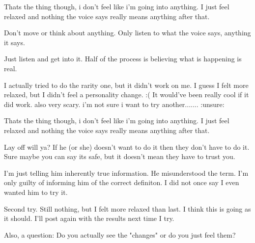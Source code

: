 \documentclass[ebook,12pt,oneside,openany]{memoir}
\begin{document}
\begin{tcolorbox}[title=Chigens and Kay,colback=olive!5!white,colframe=olive!75!black,coltitle=white]
\begin{tcolorbox}[title=Ponyworld Destroyer]
\par{Thats the thing though, i don't feel like i'm going into anything. I just feel relaxed and nothing the voice says really means anything after that.}
\end{tcolorbox}
\par{Don't move or think about anything. Only listen to what the voice says, anything it says.}
\newline{}
\par{Just listen and get into it. Half of the process is believing what is happening is real.}
\end{tcolorbox}
\begin{tcolorbox}[title=BeatrixBow]
\par{I actually tried to do the rarity one, but it didn't work on me. I guess I felt more relaxed, but I didn't feel a personality change. :( It would've been really cool if it did work. also very scary. i'm not sure i want to try another....... :unsure:}
\end{tcolorbox}
\begin{tcolorbox}[title=Harmonic Revelations,colback=brown!5!white,colframe=brown!75!black,coltitle=white]
\begin{tcolorbox}[title=Ponyworld Destroyer]
\par{Thats the thing though, i don't feel like i'm going into anything. I just feel relaxed and nothing the voice says really means anything after that.}
\newline{}
\newline{}
\par{Lay off will ya? If he (or she) doesn't want to do it then they don't have to do it. Sure maybe you can say its safe, but it doesn't mean they have to trust you. }
\end{tcolorbox}
\par{I'm just telling him inherently true information. He misunderstood the term. I'm only guilty of informing him of the correct definiton. I did not once say I even wanted him to try it.}
\end{tcolorbox}
\begin{tcolorbox}[title=Shining Wing,colback=blue!5!white,colframe=blue!75!black,coltitle=white]
\par{Second try. Still nothing, but I felt more relaxed than last. I think this is going as it should. I'll post again with the results next time I try.}
\newline{}
\par{Also, a question: Do you actually see the "changes" or do you just feel them?}
\end{tcolorbox}
\end{document}
